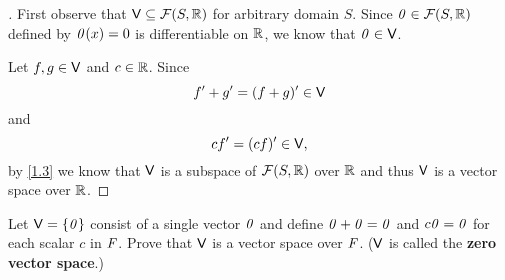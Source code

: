 \begin{proof}[]
  First observe that \(\mathsf{V} \subseteq \mathcal{F}(S, \mathbb{R})\) for arbitrary domain \(S\).
  Since \(\mathit{0} \in \mathcal{F}(S, \mathbb{R})\) defined by \(\mathit{0}(x) = 0\) is differentiable on \(\mathbb{R}\), we know that \(\mathit{0} \in \mathsf{V}\).

  Let \(f, g \in \mathsf{V}\) and \(c \in \mathbb{R}\).
  Since
  \[
    f' + g' = (f + g)' \in \mathsf{V}
  \]
  and
  \[
    cf' = (cf)' \in \mathsf{V},
  \]
  by \cref{1.3} we know that \(\mathsf{V}\) is a subspace of \(\mathcal{F}(S, \mathbb{R})\) over \(\mathbb{R}\) and thus \(\mathsf{V}\) is a vector space over \(\mathbb{R}\).
\end{proof}

\begin{ex}\label{ex:1.2.11}
  Let \(\mathsf{V} = \left\lbrace\mathit{0}\right\rbrace\) consist of a single vector \(\mathit{0}\) and define \(\mathit{0} + \mathit{0} = \mathit{0}\) and \(c\mathit{0} = \mathit{0}\) for each scalar \(c\) in \(\mathit{F}\).
  Prove that \(\mathsf{V}\) is a vector space over \(\mathit{F}\).
  (\(\mathsf{V}\) is called the \textbf{zero vector space}.)
\end{ex}


